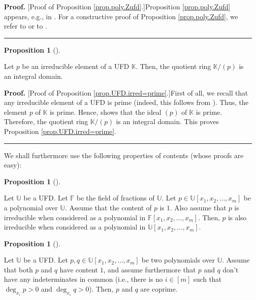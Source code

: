 \documentclass[numbers=enddot,12pt,final,onecolumn,notitlepage]{scrartcl}%
\theoremstyle{definition}
\newtheorem{prop}[theo]{Proposition}
\newenvironment{proposition}[1][]
{\begin{prop}[#1]\begin{leftbar}}
{\end{leftbar}\end{prop}}
\newenvironment{proof}[1][Proof]{\noindent\textbf{#1.} }{\ \rule{0.5em}{0.5em}}
\begin{document}
\begin{proof}
[Proof of Proposition \ref{prop.poly.Zufd}.]Proposition \ref{prop.poly.Zufd}
appears, e.g., in \cite[Remark after Corollary 8.21]{Knapp16}. For a
constructive proof of Proposition \ref{prop.poly.Zufd}, we refer to
\cite[Chapter IV, Theorems 4.8 and 4.9]{MiRiRu87} or to \cite[Essay 1.4,
Corollary of Theorem 1 and Corollary 1 of Theorem 2]{Edward22}.
\end{proof}

\begin{proposition}
\label{prop.UFD.irred=prime}Let $p$ be an irreducible element of a UFD
$\mathbb{K}$. Then, the quotient ring $\mathbb{K}/\left(  p\right)  $ is an
integral domain.
\end{proposition}

\begin{proof}
[Proof of Proposition \ref{prop.UFD.irred=prime}.]First of all, we recall that
any irreducible element of a UFD is prime (indeed, this follows from
\cite[Proposition 8.13]{Knapp16}). Thus, the element $p$ of $\mathbb{K}$ is
prime. Hence, \cite[Proposition 8.14]{Knapp16} shows that the ideal $\left(
p\right)  $ of $\mathbb{K}$ is prime. Therefore, the quotient ring
$\mathbb{K}/\left(  p\right)  $ is an integral domain. This proves Proposition
\ref{prop.UFD.irred=prime}.
\end{proof}

We shall furthermore use the following properties of contents (whose proofs
are easy):

\begin{proposition}
\label{prop.content.irred}Let $\mathbb{U}$ be a UFD. Let $\mathbb{F}$ be the
field of fractions of $\mathbb{U}$. Let $p\in\mathbb{U}\left[  x_{1}%
,x_{2},\ldots,x_{m}\right]  $ be a polynomial over $\mathbb{U}$. Assume that
the content of $p$ is $1$. Also assume that $p$ is irreducible when considered
as a polynomial in $\mathbb{F}\left[  x_{1},x_{2},\ldots,x_{m}\right]  $.
Then, $p$ is also irreducible when considered as a polynomial in
$\mathbb{U}\left[  x_{1},x_{2},\ldots,x_{m}\right]  $.
\end{proposition}

\begin{proposition}
\label{prop.content.coprime}Let $\mathbb{U}$ be a UFD. Let $p,q\in
\mathbb{U}\left[  x_{1},x_{2},\ldots,x_{m}\right]  $ be two polynomials over
$\mathbb{U}$. Assume that both $p$ and $q$ have content $1$, and assume
furthermore that $p$ and $q$ don't have any indeterminates in common (i.e.,
there is no $i\in\left[  m\right]  $ such that $\deg_{x_{i}}p>0$ and
$\deg_{x_{i}}q>0$). Then, $p$ and $q$ are coprime.
\end{proposition}
\end{document}
